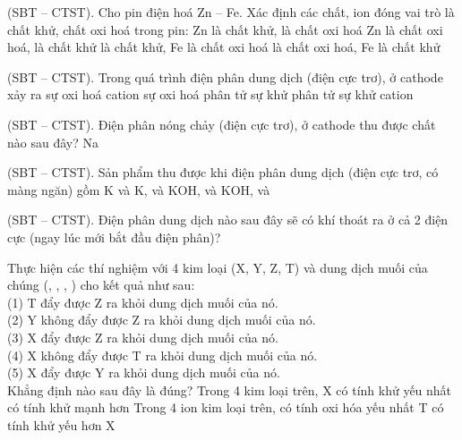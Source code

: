\documentclass[11pt,a4paper]{article}
\def\loigiai#1{}
\begin{document}
\begin{ex}
(SBT – CTST). Cho pin điện hoá Zn – Fe. Xác định các chất, ion đóng vai trò là chất khử, chất oxi hoá trong pin:
\choice
{Zn là chất khử,  là chất oxi hoá}
{Zn là chất oxi hoá,  là chất khử}
{ là chất khử, Fe là chất oxi hoá}
{ là chất oxi hoá, Fe là chất khử}
\loigiai{}
\end{ex}

\newpage

\begin{ex}
(SBT – CTST). Trong quá trình điện phân dung dịch  (điện cực trơ), ở cathode xảy ra
\choice
{sự oxi hoá cation }
{sự oxi hoá phân tử }
{sự khử phân tử }
{sự khử cation }
\loigiai{}
\end{ex}

\begin{ex}
(SBT – CTST). Điện phân nóng chảy  (điện cực trơ), ở cathode thu được chất nào sau đây?
\choice
{}
{}
{Na}
{}
\loigiai{}
\end{ex}

\begin{ex}
(SBT – CTST). Sản phẩm thu được khi điện phân dung dịch  (điện cực trơ, có màng ngăn) gồm
\choice
{K và }
{K,  và }
{KOH,  và }
{KOH,  và }
\loigiai{}
\end{ex}

\begin{ex}
(SBT – CTST). Điện phân dung dịch nào sau đây sẽ có khí thoát ra ở cả 2 điện cực (ngay lúc mới bắt đầu điện phân)?
\choice
{}
{}
{}
{}
\loigiai{}
\end{ex}

\begin{ex}
Thực hiện các thí nghiệm với 4 kim loại (X, Y, Z, T) và dung dịch muối của chúng (, , , ) cho kết quả như sau:\\
(1) T đẩy được Z ra khỏi dung dịch muối của nó.\\
(2) Y không đẩy được Z ra khỏi dung dịch muối của nó.\\
(3) X đẩy được Z ra khỏi dung dịch muối của nó.\\
(4) X không đẩy được T ra khỏi dung dịch muối của nó.\\
(5) X đẩy được Y ra khỏi dung dịch muối của nó.\\
Khẳng định nào sau đây là đúng?
\choice
{Trong 4 kim loại trên, X có tính khử yếu nhất}
{ có tính khử mạnh hơn }
{Trong 4 ion kim loại trên,  có tính oxi hóa yếu nhất}
{T có tính khử yếu hơn X}
\loigiai{}
\end{ex}
\end{document}
